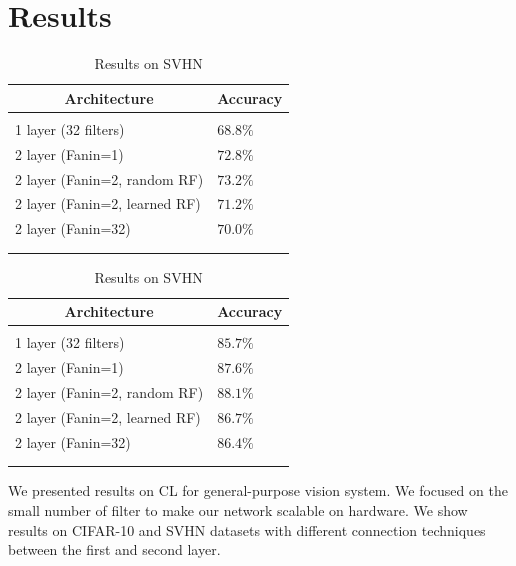 \documentclass{article} %
\begin{document}
\section{Results}
\label{sec-results}

\begin {table}
\parbox{.5\linewidth}{
\caption{Results on CIFAR-10}
\label{resuts-cifar10}
\begin{center}
\begin{tabular}{ll}
\multicolumn{1}{c}{\bf Architecture}  &\multicolumn{1}{c}{\bf Accuracy}
\\ \hline \\
1 layer (32 filters)                            & $68.8\%$\\
2 layer (Fanin=1)                            &$72.8\%$ \\
2 layer (Fanin=2, random RF)            &$73.2\%$ \\
2 layer (Fanin=2, learned RF)            &$71.2\%$\\
2 layer (Fanin=32)                          &$70.0\%$\\
\\ \hline \\
\end{tabular}
\end{center}
}
\parbox{.5\linewidth}{
\caption{Results on SVHN}
\label{resuts-svhn}
\begin{center}
\begin{tabular}{ll}
\multicolumn{1}{c}{\bf Architecture}  &\multicolumn{1}{c}{\bf Accuracy}
\\ \hline \\
1 layer (32 filters)                          & $85.7\%$\\
2 layer (Fanin=1)                           &$87.6\%$ \\
2 layer (Fanin=2, random RF)           &$88.1\%$ \\
2 layer (Fanin=2, learned RF)           &$86.7\%$\\
2 layer (Fanin=32)                        &$86.4\%$\\
\\ \hline \\
\end{tabular}
\end{center}
}
\end{table}



We presented results on CL for general-purpose vision system.
We focused on the small number of filter to make our network scalable on hardware.
We show results on CIFAR-10 and SVHN datasets with different connection techniques between the first and second layer. 
\end{document}
